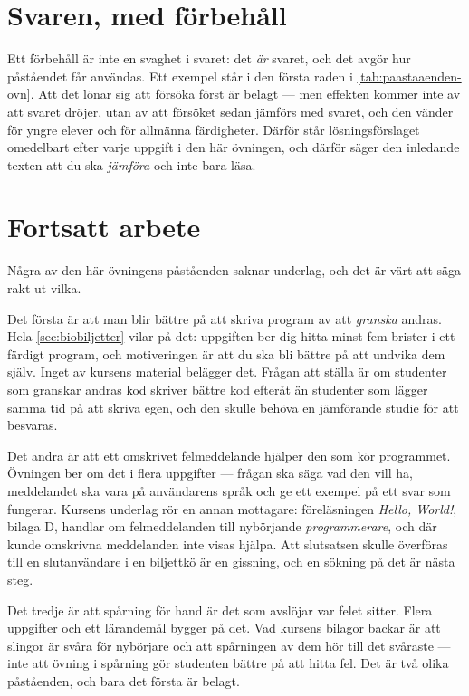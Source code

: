 \section{Svaren, med förbehåll}

Ett förbehåll är inte en svaghet i svaret: det \emph{är} svaret, och det
avgör hur påståendet får användas.  Ett exempel står i den första raden
i \cref{tab:paastaaenden-ovn}.  Att det lönar sig att försöka först är
belagt --- men effekten kommer inte av att svaret dröjer, utan av att
försöket sedan jämförs med svaret, och den vänder för yngre elever och
för allmänna färdigheter\autocite[780--781]{SinhaKapur2021}.  Därför
står lösningsförslaget omedelbart efter varje uppgift i den här
övningen, och därför säger den inledande texten att du ska
\emph{jämföra} och inte bara läsa.

\section{Fortsatt arbete}
\label{sec:ovn-fortsatt}

Några av den här övningens påståenden saknar underlag, och det är värt
att säga rakt ut vilka.

Det första är att man blir bättre på att skriva program av att
\emph{granska} andras.  Hela \cref{sec:biobiljetter} vilar på det:
uppgiften ber dig hitta minst fem brister i ett färdigt program, och
motiveringen är att du ska bli bättre på att undvika dem själv.  Inget
av kursens material belägger det.  Frågan att ställa är om studenter som
granskar andras kod skriver bättre kod efteråt än studenter som lägger
samma tid på att skriva egen, och den skulle behöva en jämförande studie
för att besvaras.

Det andra är att ett omskrivet felmeddelande hjälper den som kör
programmet.  Övningen ber om det i flera uppgifter --- frågan ska säga
vad den vill ha, meddelandet ska vara på användarens språk och ge ett
exempel på ett svar som fungerar.  Kursens underlag rör en annan
mottagare: föreläsningen \emph{Hello, World!}, bilaga D, handlar om
felmeddelanden till nybörjande \emph{programmerare}, och där kunde
omskrivna meddelanden inte visas hjälpa.  Att slutsatsen skulle
överföras till en slutanvändare i en biljettkö är en gissning, och en
sökning på det är nästa steg.

Det tredje är att spårning för hand är det som avslöjar var felet
sitter.  Flera uppgifter och ett lärandemål bygger på det.  Vad kursens
bilagor backar är att slingor är svåra för nybörjare och att
spårningen av dem hör till det svåraste --- inte att övning i spårning
gör studenten bättre på att hitta fel.  Det är två olika påståenden, och
bara det första är belagt.

